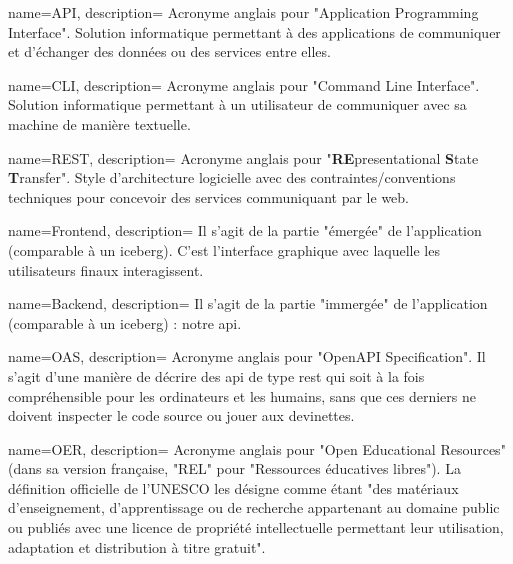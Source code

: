 



{
    name={API},
    description={
        Acronyme anglais pour "Application Programming Interface".
        Solution informatique permettant à des applications de communiquer et d'échanger des données ou des services entre elles.
    }
}

{
    name={CLI},
    description={
        Acronyme anglais pour "Command Line Interface".
        Solution informatique permettant à un utilisateur de communiquer avec sa machine de manière textuelle.
    }
}

{
    name={REST},
    description={
        Acronyme anglais pour "\textbf{RE}presentational \textbf{S}tate \textbf{T}ransfer".
        Style d'architecture logicielle avec des contraintes/conventions techniques pour concevoir des services communiquant par le web.
    }
}

{
    name={Frontend},
    description={
        Il s'agit de la partie "émergée" de l'application (comparable à un iceberg). C'est l'interface graphique avec laquelle les utilisateurs finaux interagissent.  
    }
}

{
    name={Backend},
    description={
        Il s'agit de la partie "immergée" de l'application (comparable à un iceberg) : notre \Gls{api}.
    }
}

{
    name={OAS},
    description={
        Acronyme anglais pour "OpenAPI Specification".
        Il s'agit d'une manière de décrire des \Gls{api} de type \Gls{rest} qui soit à la fois compréhensible pour les ordinateurs et les humains, sans que ces derniers ne doivent inspecter le code source ou jouer aux devinettes.
    }
}

{
    name={OER},
    description={
        Acronyme anglais pour "Open Educational Resources" (dans sa version française, "REL" pour "Ressources éducatives libres").
        La définition officielle de l'UNESCO\cite{UNESCO} les désigne comme étant "des matériaux d’enseignement, d'apprentissage ou de recherche appartenant au domaine public ou publiés avec une licence de propriété intellectuelle permettant leur utilisation, adaptation et distribution à titre gratuit".
    }
}

